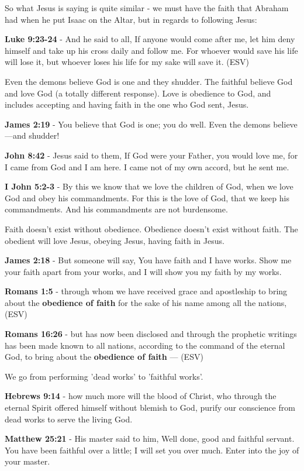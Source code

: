 \documentclass[11pt]{article}
\begin{document}
So what Jesus is saying is quite similar - we must have the faith that Abraham had when he put Isaac on the Altar, but in regards to following Jesus:

\textbf{Luke 9:23-24} - And he said to all, If anyone would come after me, let him deny himself and take up his cross daily and follow me. For whoever would save his life will lose it, but whoever loses his life for my sake will save it. (ESV)

Even the demons believe God is one and they shudder. The faithful believe God and love God (a totally different response). Love is obedience to God, and includes accepting and having faith in the one who God sent, Jesus.

\textbf{James 2:19} - You believe that God is one; you do well. Even the demons believe—and shudder!

\textbf{John 8:42} - Jesus said to them, If God were your Father, you would love me, for I came from God and I am here. I came not of my own accord, but he sent me.

\textbf{I John 5:2-3} - By this we know that we love the children of God, when we love God and obey his commandments. For this is the love of God, that we keep his commandments. And his commandments are not burdensome.

Faith doesn't exist without obedience. Obedience doesn't exist without faith. The obedient will love Jesus, obeying Jesus, having faith in Jesus.

\textbf{James 2:18} - But someone will say, You have faith and I have works. Show me your faith apart from your works, and I will show you my faith by my works.

\textbf{Romans 1:5} - through whom we have received grace and apostleship to bring about the \textbf{obedience of faith} for the sake of his name among all the nations, (ESV)

\textbf{Romans 16:26} - but has now been disclosed and through the prophetic writings has been made known to all nations, according to the command of the eternal God, to bring about the \textbf{obedience of faith} — (ESV)

We go from performing 'dead works' to 'faithful works'.

\textbf{Hebrews 9:14} - how much more will the blood of Christ, who through the eternal Spirit offered himself without blemish to God, purify our conscience from dead works to serve the living God.

\textbf{Matthew 25:21} - His master said to him, Well done, good and faithful servant. You have been faithful over a little; I will set you over much. Enter into the joy of your master.
\end{document}
